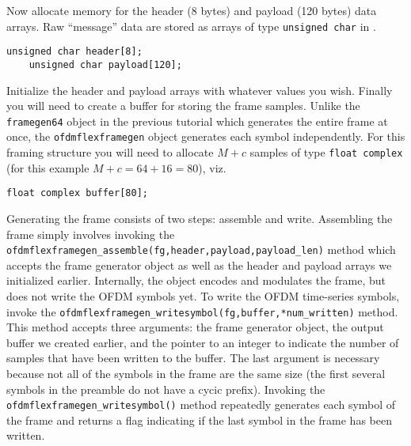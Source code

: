 Now allocate memory for the header (8 bytes) and payload (120 bytes)
data arrays.
Raw ``message'' data are stored as arrays of type {\tt unsigned char} in
\liquid.
%
\begin{Verbatim}[fontsize=\small]
    unsigned char header[8];
    unsigned char payload[120];
\end{Verbatim}
%
Initialize the header and payload arrays with whatever values you wish.
%
Finally you will need to create a buffer for storing the frame samples.
Unlike the {\tt framegen64} object in the previous tutorial which
generates the entire frame at once,
the {\tt ofdmflexframegen} object generates each symbol independently.
For this framing structure you will need to allocate $M+c$ samples of
type {\tt float complex} (for this example $M+c = 64+16 = 80$), viz.
%
\begin{Verbatim}[fontsize=\small]
    float complex buffer[80];
\end{Verbatim}
%
Generating the frame consists of two steps: assemble and write.
Assembling the frame simply involves invoking
the {\tt ofdmflexframegen\_assemble(fg,header,payload,payload\_len)}
method which accepts the frame generator object as well as the header
and payload arrays we initialized earlier.
Internally, the object encodes and modulates the frame, but does not
write the OFDM symbols yet.
To write the OFDM time-series symbols, invoke the
{\tt ofdmflexframegen\_writesymbol(fg,buffer,*num\_written)} method.
This method accepts three arguments:
  the frame generator object,
  the output buffer we created earlier,
  and the pointer to an integer to indicate the number of samples that
  have been written to the buffer.
The last argument is necessary because not all of the symbols in the
frame are the same size (the first several symbols in the preamble do
not have a cycic prefix).
Invoking the {\tt ofdmflexframegen\_writesymbol()} method repeatedly
generates each symbol of the frame
and returns a flag indicating if the last symbol in the frame has been
written.

